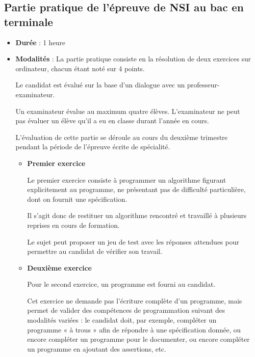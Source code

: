 \documentclass[
  a4paper,
  DIV=11,
  numbers=noendperiod]{scrartcl}
\begin{document}
\hypertarget{partie-pratique-de-luxe9preuve-de-nsi-au-bac-en-terminale}{%
\subsection{Partie pratique de l'épreuve de NSI au bac en
terminale}\label{partie-pratique-de-luxe9preuve-de-nsi-au-bac-en-terminale}}

\begin{itemize}
\item
  \textbf{Durée} : 1 heure
\item
  \textbf{Modalités} : La partie pratique consiste en la résolution de
  deux exercices sur ordinateur, chacun étant noté sur 4 points.

  Le candidat est évalué sur la base d'un dialogue avec un
  professeur-examinateur.

  Un examinateur évalue au maximum quatre élèves. L'examinateur ne peut
  pas évaluer un élève qu'il a eu en classe durant l'année en cours.

  L'évaluation de cette partie se déroule au cours du deuxième trimestre
  pendant la période de l'épreuve écrite de spécialité.

  \begin{itemize}
  \item
    \textbf{Premier exercice}

    Le premier exercice consiste à programmer un algorithme figurant
    explicitement au programme, ne présentant pas de difficulté
    particulière, dont on fournit une spécification.

    Il s'agit donc de restituer un algorithme rencontré et travaillé à
    plusieurs reprises en cours de formation.

    Le sujet peut proposer un jeu de test avec les réponses attendues
    pour permettre au candidat de vérifier son travail.
  \item
    \textbf{Deuxième exercice}

    Pour le second exercice, un programme est fourni au candidat.

    Cet exercice ne demande pas l'écriture complète d'un programme, mais
    permet de valider des compétences de programmation suivant des
    modalités variées : le candidat doit, par exemple, compléter un
    programme « à trous » afin de répondre à une spécification donnée,
    ou encore compléter un programme pour le documenter, ou encore
    compléter un programme en ajoutant des assertions, etc.
  \end{itemize}
\end{itemize}
\end{document}
